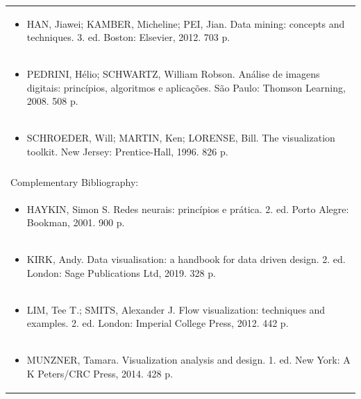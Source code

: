 \documentclass[11pt]{article}
\begin{document}
\begin{center}
\begin{longtable}{|p{4cm}|p{4cm}|p{4cm}|p{4cm}|}
\multicolumn{4}{|p{\dimexpr 16cm + 6\tabcolsep\relax}|}{\begin{itemize}\item HAN, Jiawei; KAMBER, Micheline; PEI, Jian. Data mining: concepts and techniques. 3. ed. Boston: Elsevier, 2012. 703 p.\end{itemize}}\\
\multicolumn{4}{|p{\dimexpr 16cm + 6\tabcolsep\relax}|}{\begin{itemize}\item PEDRINI, Hélio; SCHWARTZ, William Robson. Análise de imagens digitais: princípios, algoritmos e aplicações. São Paulo: Thomson Learning, 2008. 508 p.\end{itemize}}\\
\multicolumn{4}{|p{\dimexpr 16cm + 6\tabcolsep\relax}|}{\begin{itemize}\item SCHROEDER, Will; MARTIN, Ken; LORENSE, Bill. The visualization toolkit. New Jersey: Prentice-Hall, 1996. 826 p.\end{itemize}}\\
\multicolumn{4}{|p{16cm}|}{}\\
\hline
\multicolumn{4}{|p{16cm}|}{Complementary Bibliography:}\\*
\multicolumn{4}{|p{\dimexpr 16cm + 6\tabcolsep\relax}|}{\begin{itemize}\item HAYKIN, Simon S. Redes neurais: princípios e prática. 2. ed. Porto Alegre: Bookman, 2001. 900 p.\end{itemize}}\\
\multicolumn{4}{|p{\dimexpr 16cm + 6\tabcolsep\relax}|}{\begin{itemize}\item KIRK, Andy. Data visualisation: a handbook for data driven design. 2. ed. London: Sage Publications Ltd, 2019. 328 p.\end{itemize}}\\
\multicolumn{4}{|p{\dimexpr 16cm + 6\tabcolsep\relax}|}{\begin{itemize}\item LIM, Tee T.; SMITS, Alexander J. Flow visualization: techniques and examples. 2. ed. London: Imperial College Press, 2012. 442 p.\end{itemize}}\\
\multicolumn{4}{|p{\dimexpr 16cm + 6\tabcolsep\relax}|}{\begin{itemize}\item MUNZNER, Tamara. Visualization analysis and design. 1. ed. New York: A K Peters/CRC Press, 2014. 428 p.\end{itemize}}\\

\end{longtable}
\end{center}
\end{document}
